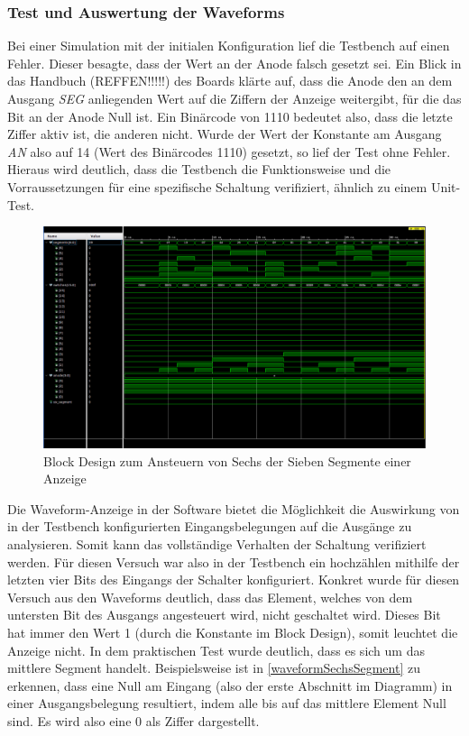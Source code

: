 \documentclass[11pt, a4paper]{article}
\begin{document}
\subsubsection*{Test und Auswertung der Waveforms}
Bei einer Simulation mit der initialen Konfiguration lief die Testbench auf einen Fehler. Dieser besagte, dass der Wert an der Anode falsch gesetzt sei. Ein Blick in das Handbuch (REFFEN!!!!!) des Boards klärte auf, dass die Anode den an dem Ausgang \textit{SEG} anliegenden Wert auf die Ziffern der Anzeige weitergibt, für die das Bit an der Anode Null ist. Ein Binärcode von 1110 bedeutet also, dass die letzte Ziffer aktiv ist, die anderen nicht.
Wurde der Wert der Konstante am Ausgang \textit{AN} also auf 14 (Wert des Binärcodes 1110) gesetzt, so lief der Test ohne Fehler.
Hieraus wird deutlich, dass die Testbench die Funktionsweise und die Vorraussetzungen für eine spezifische Schaltung verifiziert, ähnlich zu einem Unit-Test.
\begin{figure}[htb]    
    \centering
    \includegraphics[width=\linewidth]{versuch1Data/waveform1.png}
    \caption{Block Design zum Ansteuern von Sechs der Sieben Segmente einer Anzeige}
    \label{waveformSechsSegment}        
\end{figure}
Die Waveform-Anzeige in der Software bietet die Möglichkeit die Auswirkung von in der Testbench konfigurierten Eingangsbelegungen auf die Ausgänge zu analysieren. Somit kann das vollständige Verhalten der Schaltung verifiziert werden.
Für diesen Versuch war also in der Testbench ein hochzählen mithilfe der letzten vier Bits des Eingangs der Schalter konfiguriert.
Konkret wurde für diesen Versuch aus den Waveforms deutlich, dass das Element, welches von dem untersten Bit des Ausgangs angesteuert wird, nicht geschaltet wird. Dieses Bit hat immer den Wert 1 (durch die Konstante im Block Design), somit leuchtet die Anzeige nicht. In dem praktischen Test wurde deutlich, dass es sich um das mittlere Segment handelt.
Beispielsweise ist in \autoref{waveformSechsSegment} zu erkennen, dass eine Null am Eingang (also der erste Abschnitt im Diagramm) in einer Ausgangsbelegung resultiert, indem alle bis auf das mittlere Element Null sind. Es wird also eine 0 als Ziffer dargestellt.
\end{document}
